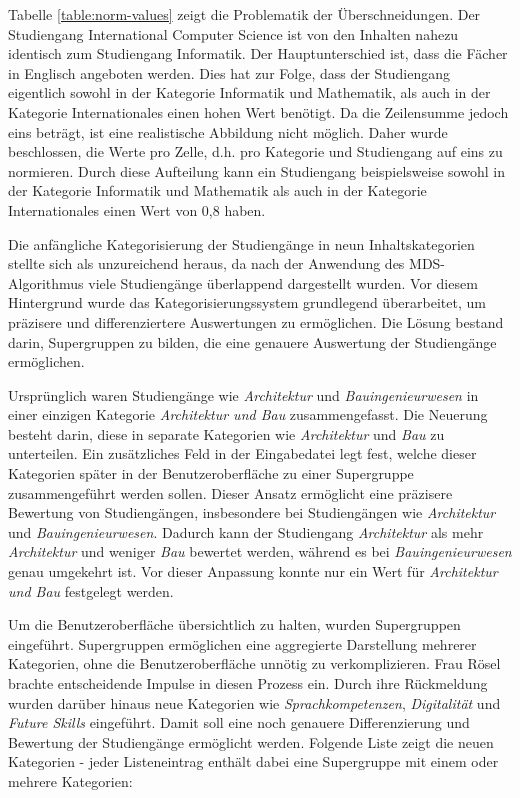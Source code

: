 Tabelle \ref{table:norm-values} zeigt die Problematik der Überschneidungen. Der Studiengang International Computer Science ist von den Inhalten nahezu identisch zum Studiengang Informatik. Der Hauptunterschied ist, dass die Fächer in Englisch angeboten werden. Dies hat zur Folge, dass der Studiengang eigentlich sowohl in der Kategorie Informatik und Mathematik, als auch in der Kategorie Internationales einen hohen Wert benötigt. Da die Zeilensumme jedoch eins beträgt, ist eine realistische Abbildung nicht möglich. Daher wurde beschlossen, die Werte pro Zelle, d.h. pro Kategorie und Studiengang auf eins zu normieren. Durch diese Aufteilung kann ein Studiengang beispielsweise sowohl in der Kategorie Informatik und Mathematik als auch in der Kategorie Internationales einen Wert von 0,8 haben.

Die anfängliche Kategorisierung der Studiengänge in neun Inhaltskategorien stellte sich als unzureichend heraus, da nach der Anwendung des MDS-Algorithmus viele Studiengänge überlappend dargestellt wurden. Vor diesem Hintergrund wurde das Kategorisierungssystem grundlegend überarbeitet, um präzisere und differenziertere Auswertungen zu ermöglichen. Die Lösung bestand darin, Supergruppen zu bilden, die eine genauere Auswertung der Studiengänge ermöglichen.

Ursprünglich waren Studiengänge wie \textit{Architektur} und \textit{Bauingenieurwesen} in einer einzigen Kategorie \textit{Architektur und Bau} zusammengefasst. Die Neuerung besteht darin, diese in separate Kategorien wie \textit{Architektur} und \textit{Bau} zu unterteilen. Ein zusätzliches Feld in der Eingabedatei legt fest, welche dieser Kategorien später in der Benutzeroberfläche zu einer Supergruppe zusammengeführt werden sollen. Dieser Ansatz ermöglicht eine präzisere Bewertung von Studiengängen, insbesondere bei Studiengängen wie \textit{Architektur} und \textit{Bauingenieurwesen}. Dadurch kann der Studiengang \textit{Architektur} als mehr \textit{Architektur} und weniger \textit{Bau} bewertet werden, während es bei \textit{Bauingenieurwesen} genau umgekehrt ist. Vor dieser Anpassung konnte nur ein Wert für \textit{Architektur und Bau} festgelegt werden.

Um die Benutzeroberfläche übersichtlich zu halten, wurden Supergruppen eingeführt. Supergruppen ermöglichen eine aggregierte Darstellung mehrerer Kategorien, ohne die Benutzeroberfläche unnötig zu verkomplizieren. Frau Rösel brachte entscheidende Impulse in diesen Prozess ein. Durch ihre Rückmeldung wurden darüber hinaus neue Kategorien wie \textit{Sprachkompetenzen}, \textit{Digitalität} und \textit{Future Skills} eingeführt. Damit soll eine noch genauere Differenzierung und Bewertung der Studiengänge ermöglicht werden. Folgende Liste zeigt die neuen Kategorien - jeder Listeneintrag enthält dabei eine Supergruppe mit einem oder mehrere Kategorien:

